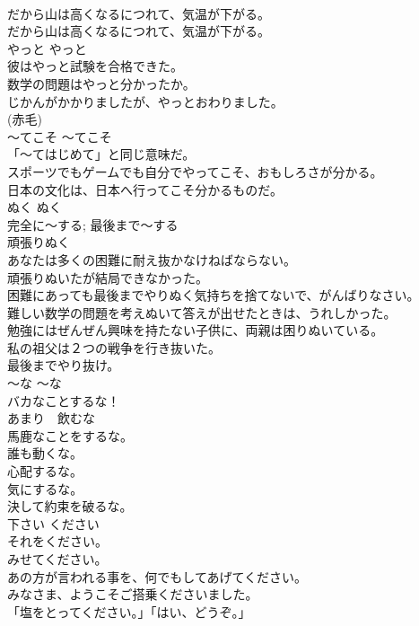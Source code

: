 \documentclass[8pt]{extreport}
\begin{document}
\begin{CJK}{UTF8}{min}
\\	だから山は高くなるにつれて、気温が下がる。  
\\	だから山は高くなるにつれて、気温が下がる。  
\\	やっと	やっと	
\\	彼はやっと試験を合格できた。  
\\	数学の問題はやっと分かったか。  
\\	じかんがかかりましたが、やっとおわりました。  
\\	(赤毛)
\\	〜てこそ	〜てこそ	
\\	「〜てはじめて」と同じ意味だ。	
\\	スポーツでもゲームでも自分でやってこそ、おもしろさが分かる。  
\\	日本の文化は、日本へ行ってこそ分かるものだ。  
\\	ぬく	ぬく	
\\	完全に〜する; 最後まで〜する	
\\	頑張りぬく  
\\	あなたは多くの困難に耐え抜かなけねばならない。  
\\	頑張りぬいたが結局できなかった。  
\\	困難にあっても最後までやりぬく気持ちを捨てないで、がんばりなさい。   
\\	難しい数学の問題を考えぬいて答えが出せたときは、うれしかった。   
\\	勉強にはぜんぜん興味を持たない子供に、両親は困りぬいている。  
\\	私の祖父は２つの戦争を行き抜いた。   
\\	最後までやり抜け。  
\\	〜な	〜な	
\\	バカなことするな！  
\\	あまり　飲むな   
\\	馬鹿なことをするな。   
\\	誰も動くな。  
\\	心配するな。  
\\	気にするな。   
\\	決して約束を破るな。   
\\	下さい	ください	
\\	それをください。  
\\	みせてください。  
\\	あの方が言われる事を、何でもしてあげてください。  
\\	みなさま、ようこそご搭乗くださいました。  
\\	「塩をとってください。」「はい、どうぞ。」  

\end{CJK}
\end{document}
